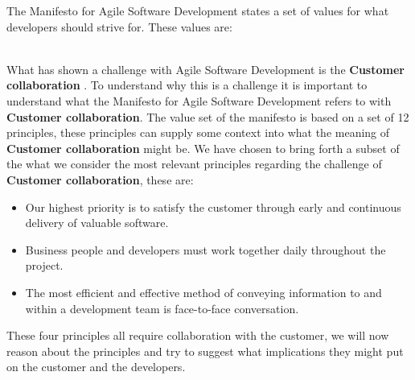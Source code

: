 The Manifesto for Agile Software Development states a set of values for what developers should strive for. These values are: \\
\noindent\hrulefill\par
\noindent{} \\
What has shown a challenge with Agile Software Development is the \textbf{Customer collaboration} \cite{Hoda2011TheIO}. To understand why this is a challenge it is important to understand what the Manifesto for Agile Software Development refers to with \textbf{Customer collaboration}. The value set of the manifesto is based on a set of 12 principles, these principles can supply some context into what the meaning of \textbf{Customer collaboration} might be. We have chosen to bring forth a subset of the what we consider the most relevant principles regarding the challenge of \textbf{Customer collaboration}, these are:

\begin{itemize}
  \item Our highest priority is to satisfy the customer through early and continuous delivery of valuable software.
  \item Business people and developers must work together daily throughout the project.
  \item The most efficient and effective method of conveying information to and within a development team is face-to-face conversation.
\end{itemize}

These four principles all require collaboration with the customer, we will now reason about the principles and try to suggest what implications they might put on the customer and the developers.

